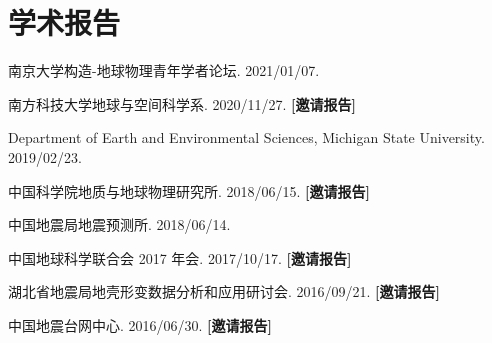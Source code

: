 \section{学术报告}

\newcommand{\Invited}{\textbf{[邀请报告]}}

\begin{etaremune}
\item
    南京大学构造-地球物理青年学者论坛.
    2021/01/07.
\item
    南方科技大学地球与空间科学系.
    2020/11/27.
    \Invited
\item
    Department of Earth and Environmental Sciences, Michigan State University.
    2019/02/23.
\item
    中国科学院地质与地球物理研究所.
    2018/06/15.
    \Invited
\item
    中国地震局地震预测所.
    2018/06/14.
\item
    中国地球科学联合会 2017 年会.
    2017/10/17.
    \Invited
\item
    湖北省地震局地壳形变数据分析和应用研讨会.
    2016/09/21.
    \Invited
\item
    中国地震台网中心.
    2016/06/30.
    \Invited
\end{etaremune}
